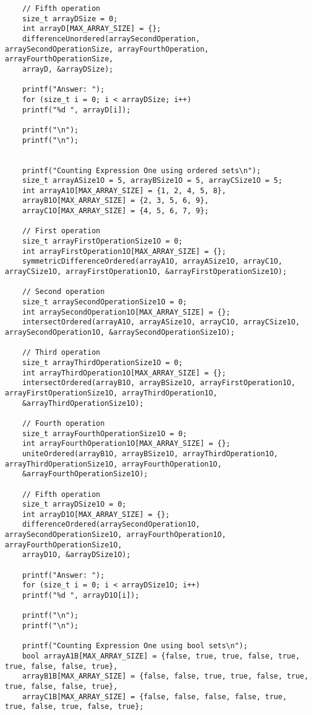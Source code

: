 \documentclass[a4paper,14pt]{extarticle}
\begin{document}
\begin{enumerate}[№1. ]
\begin{verbatim}
	// Fifth operation
	size_t arrayDSize = 0;
	int arrayD[MAX_ARRAY_SIZE] = {};
	differenceUnordered(arraySecondOperation, arraySecondOperationSize, arrayFourthOperation, arrayFourthOperationSize,
	arrayD, &arrayDSize);
	
	printf("Answer: ");
	for (size_t i = 0; i < arrayDSize; i++)
	printf("%d ", arrayD[i]);
	
	printf("\n");
	printf("\n");
	
	
	printf("Counting Expression One using ordered sets\n");
	size_t arrayASize1O = 5, arrayBSize1O = 5, arrayCSize1O = 5;
	int arrayA1O[MAX_ARRAY_SIZE] = {1, 2, 4, 5, 8},
	arrayB1O[MAX_ARRAY_SIZE] = {2, 3, 5, 6, 9},
	arrayC1O[MAX_ARRAY_SIZE] = {4, 5, 6, 7, 9};
	
	// First operation
	size_t arrayFirstOperationSize1O = 0;
	int arrayFirstOperation1O[MAX_ARRAY_SIZE] = {};
	symmetricDifferenceOrdered(arrayA1O, arrayASize1O, arrayC1O, arrayCSize1O, arrayFirstOperation1O, &arrayFirstOperationSize1O);
	
	// Second operation
	size_t arraySecondOperationSize1O = 0;
	int arraySecondOperation1O[MAX_ARRAY_SIZE] = {};
	intersectOrdered(arrayA1O, arrayASize1O, arrayC1O, arrayCSize1O, arraySecondOperation1O, &arraySecondOperationSize1O);
	
	// Third operation
	size_t arrayThirdOperationSize1O = 0;
	int arrayThirdOperation1O[MAX_ARRAY_SIZE] = {};
	intersectOrdered(arrayB1O, arrayBSize1O, arrayFirstOperation1O, arrayFirstOperationSize1O, arrayThirdOperation1O,
	&arrayThirdOperationSize1O);
	
	// Fourth operation
	size_t arrayFourthOperationSize1O = 0;
	int arrayFourthOperation1O[MAX_ARRAY_SIZE] = {};
	uniteOrdered(arrayB1O, arrayBSize1O, arrayThirdOperation1O, arrayThirdOperationSize1O, arrayFourthOperation1O,
	&arrayFourthOperationSize1O);
	
	// Fifth operation
	size_t arrayDSize1O = 0;
	int arrayD1O[MAX_ARRAY_SIZE] = {};
	differenceOrdered(arraySecondOperation1O, arraySecondOperationSize1O, arrayFourthOperation1O, arrayFourthOperationSize1O,
	arrayD1O, &arrayDSize1O);
	
	printf("Answer: ");
	for (size_t i = 0; i < arrayDSize1O; i++)
	printf("%d ", arrayD1O[i]);
	
	printf("\n");
	printf("\n");
	
	printf("Counting Expression One using bool sets\n");
	bool arrayA1B[MAX_ARRAY_SIZE] = {false, true, true, false, true, true, false, false, true},
	arrayB1B[MAX_ARRAY_SIZE] = {false, false, true, true, false, true, true, false, false, true},
	arrayC1B[MAX_ARRAY_SIZE] = {false, false, false, false, true, true, false, true, false, true};
	

\end{verbatim}
\end{enumerate}
\end{document}
